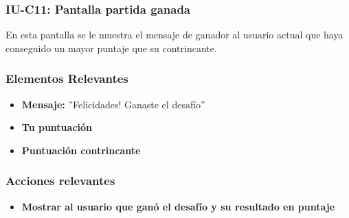 
\subsubsection{IU-C11: Pantalla partida ganada}

 En esta pantalla se le muestra el mensaje de ganador al usuario actual que haya conseguido un mayor puntaje que su contrincante.


\subsubsection{Elementos Relevantes}

    \begin{itemize}
    \item {\bf Mensaje:} ''Felicidades! Ganaste el desafío''
    \item {\bf Tu puntuación}
    \item {\bf Puntuación contrincante}
    \end{itemize}

\subsubsection{Acciones relevantes}

    \begin{itemize}
    \item {\bf Mostrar al usuario que ganó el desafío y su resultado en puntaje}

    \end{itemize}

\clearpage
